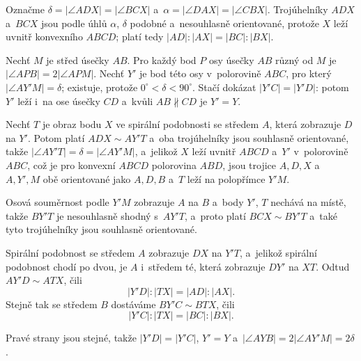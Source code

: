 %
{
    Označme $\delta = |\angle ADX| = |\angle BCX|$ a~$\alpha = |\angle DAX| = |\angle CBX|$. Trojúhelníky $ADX$ a~$BCX$ jsou podle úhlů $\alpha$, $\delta$ podobné a~nesouhlasně orientované, protože $X$ leží uvnitř konvexního $ABCD$; platí tedy $|AD| : |AX| = |BC| : |BX|$.

    Nechť $M$ je střed úsečky $AB$. Pro každý bod $P$ osy úsečky $AB$ různý od $M$ je $|\angle APB| = 2|\angle APM|$. Nechť $Y'$ je bod této osy v~polorovině $ABC$, pro který $|\angle AY'M| = \delta$; existuje, protože $0^\circ < \delta < 90^\circ$. Stačí dokázat $|Y'C| = |Y'D|$: potom $Y'$ leží i~na ose úsečky $CD$ a~kvůli $AB \nparallel CD$ je $Y' = Y$.

    Nechť $T$ je obraz bodu $X$ ve spirální podobnosti se středem $A$, která zobrazuje $D$ na $Y'$. Potom platí $ADX \sim AY'T$ a~oba trojúhelníky jsou souhlasně orientované, takže $|\angle AY'T| = \delta = |\angle AY'M|$, a~jelikož $X$ leží uvnitř $ABCD$ a~$Y'$ v~polorovině $ABC$, což je pro konvexní $ABCD$ polorovina $ABD$, jsou trojice $A, D, X$ a~$A, Y', M$ obě orientované jako $A, D, B$ a~$T$ leží na polopřímce $Y'M$.


    Osová souměrnost podle $Y'M$ zobrazuje $A$ na $B$ a~body $Y'$, $T$ nechává na místě, takže $BY'T$ je nesouhlasně shodný s~$AY'T$, a~proto platí $BCX \sim BY'T$ a~také tyto trojúhelníky jsou souhlasně orientované.

    Spirální podobnost se středem $A$ zobrazuje $DX$ na $Y'T$, a~jelikož spirální podobnost chodí po dvou, je $A$ i~středem té, která zobrazuje $DY'$ na $XT$. Odtud $AY'D \sim ATX$, čili
    $$
    |Y'D| : |TX| = |AD| : |AX|.
    $$
    Stejně tak se středem $B$ dostáváme $BY'C \sim BTX$, čili
    $$
    |Y'C| : |TX| = |BC| : |BX|.
    $$

    Pravé strany jsou stejné, takže $|Y'D| = |Y'C|$, $Y' = Y$ a~$|\angle AYB| = 2|\angle AY'M| = 2\delta$.
}

\DisplayHints

\DisplayProblemSolutions

\bye
